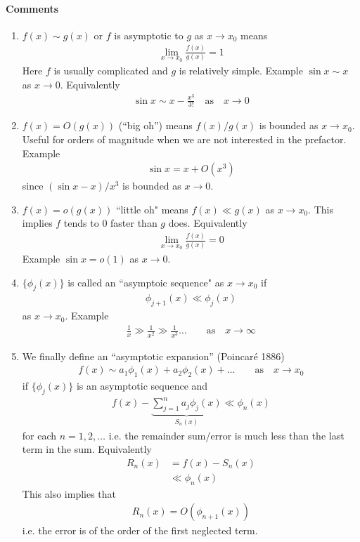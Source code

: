 \paragraph{Comments}

\begin{enumerate}
	\item $f(x) \sim g(x)$ or $f$ is asymptotic to $g$ as $x \rightarrow x_0$ means
	\begin{gather*}
		\lim\limits_{x \rightarrow x_0} \frac{f(x)}{g(x)} = 1
	\end{gather*}
	Here $f$ is usually complicated and $g$ is relatively simple. Example $\sin x \sim x$ as $x \rightarrow 0$. Equivalently
	\begin{gather*}
		\sin x \sim x - \frac{x^3}{3!} \quad \text{as} \quad x \rightarrow 0
	\end{gather*}
	\item $f(x) = {O}(g(x))$ (``big oh'') means $f(x)/g(x)$	is bounded as $x \rightarrow x_0$. Useful for orders of magnitude when we are not interested in the prefactor. Example
	\begin{gather*}
		\sin x = x + {O}(x^3)
	\end{gather*}
	since $(\sin x - x)/x^3$ is bounded as $x \rightarrow 0$.
	\item $f(x) = o(g(x))$ ``little oh" means
	$f(x) \ll g(x)$	as $x \rightarrow x_0$. This implies $f$ tends to 0 faster than $g$ does. Equivalently
	\begin{gather*}
		\lim\limits_{x\rightarrow x_0} \frac{f(x)}{g(x)} = 0
	\end{gather*}
	Example $\sin x = o(1)$ as $x \rightarrow 0$. 
	\item $\{\phi_j(x)\}$ is called an ``asymptoic sequence" as $x \rightarrow x_0$ if 
	\begin{gather*}
		\phi_{j+1}(x) \ll \phi_j(x)
	\end{gather*}
	as $x \rightarrow x_0$. Example
	\begin{align*}
		\frac{1}{x} \gg \frac{1}{x^2} \gg \frac{1}{x^3} \dots \qquad \text{as} \quad x \rightarrow \infty
	\end{align*}
	\item We finally define an ``asymptotic expansion'' (Poincar\'e 1886)
	\begin{gather*}
		f(x) \sim a_1 \phi_1(x) + a_2 \phi_2(x) + \dots \qquad \text{as} \quad x \rightarrow x_0
	\end{gather*}
	if $\{\phi_j(x)\}$ is an asymptotic sequence and
	\begin{gather*}
		f(x) - \underbrace{\sum_{j=1}^{n} a_j \phi_j(x)}_{S_n(x)} \ll \phi_n(x)
	\end{gather*}
	for each $n=1,2,\dots$ i.e. the remainder sum/error is much less than the last term in the sum. Equivalently
	\begin{align*}
		R_n(x) &= f(x) - S_n(x) \\
		& \ll \phi_n(x)
	\end{align*}
	This also implies that
	\begin{gather*}
		R_n(x) = O(\phi_{n+1}(x))
	\end{gather*}
	i.e. the error is of the order of the first neglected term.
\end{enumerate}
